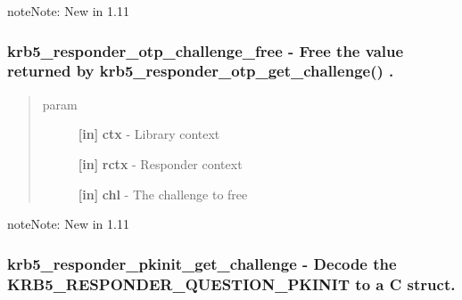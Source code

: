 \documentclass[letterpaper,10pt,english]{sphinxmanual}
\begin{document}
\begin{notice}{note}{Note:}
New in 1.11
\end{notice}


\subsubsection{krb5\_responder\_otp\_challenge\_free -  Free the value returned by krb5\_responder\_otp\_get\_challenge() .}
\label{appdev/refs/api/krb5_responder_otp_challenge_free:krb5-responder-otp-challenge-free-free-the-value-returned-by-krb5-responder-otp-get-challenge}\label{appdev/refs/api/krb5_responder_otp_challenge_free::doc}

\begin{fulllineitems}
\label{appdev/refs/api/krb5_responder_otp_challenge_free:c.krb5_responder_otp_challenge_free}
\end{fulllineitems}

\begin{quote}\begin{description}
\item[{param}] \leavevmode
\textbf{{[}in{]}} \textbf{ctx} - Library context

\textbf{{[}in{]}} \textbf{rctx} - Responder context

\textbf{{[}in{]}} \textbf{chl} - The challenge to free

\end{description}\end{quote}

\begin{notice}{note}{Note:}
New in 1.11
\end{notice}


\subsubsection{krb5\_responder\_pkinit\_get\_challenge -  Decode the KRB5\_RESPONDER\_QUESTION\_PKINIT to a C struct.}
\label{appdev/refs/api/krb5_responder_pkinit_get_challenge:krb5-responder-pkinit-get-challenge-decode-the-krb5-responder-question-pkinit-to-a-c-struct}\label{appdev/refs/api/krb5_responder_pkinit_get_challenge::doc}
\end{document}
